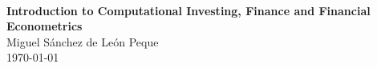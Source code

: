 \begin{titlepage}
\begin{center}
	\ \\%
	\vspace{7.0cm}
	\LARGE{\textbf{Introduction to Computational Investing, Finance and Financial Econometrics}} \\
	\vspace{1.0cm}
	\Large{Miguel Sánchez de León Peque} \\
	\vspace{0.5cm}
	\large{\today}
\end{center}
\end{titlepage}

